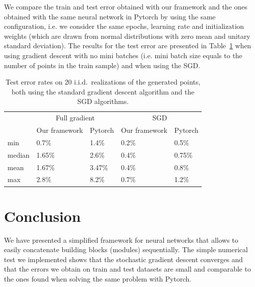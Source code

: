 \documentclass[10pt,final,a4paper]{article}
\begin{document}
We compare the train and test error obtained with our framework and the ones obtained with the same neural network in Pytorch by using the same configuration, i.e. we consider the same epochs, learning rate and initialization weights (which are drawn from normal distributions with zero mean and unitary standard deviation). The results for the test error are presented in Table~\ref{t1} when using gradient descent with no mini batches (i.e. mini batch size equals to the number of points in the train sample) and when using the SGD.

 \begin{table}
 \begin{center}
    \begin{tabular}{l l l l l}
\toprule
     $ $ & \multicolumn{2}{c}{Full gradient} & \multicolumn{2}{c}{SGD} \\
     \cmidrule(lr){2-3}
     \cmidrule(lr){4-5}
     $ $ & Our framework & Pytorch & Our framework & Pytorch \\
\midrule
    min      	& 0.7\% 		& 1.4\% 		& 0.2\% & 0.5\%\\
    median 	& 1.65\% 	& 2.6\% 		& 0.4\% & 0.75\% \\
    mean    	& 1.67\%		& 3.47\%		& 0.4\% & 0.8\% \\
    max      	& 2.8\% 		& 8.2\% 		& 0.7\% & 1.2\%  \\
\bottomrule
    \end{tabular}
    \end{center}
    \caption{Test error rates on 20 i.i.d.\ realizations of the generated points, both using the standard gradient descent algorithm and the SGD algorithms.}
    \label{t1}
    \end{table}
\section{Conclusion}
We have presented a simplified framework for neural networks that allows to easily concatenate building blocks (modules) sequentially. The simple numerical test we implemented shows that the stochastic gradient descent converges and that the errors we obtain on train and test datasets are small and comparable to the ones found when solving the same problem with Pytorch. 
\end{document}
